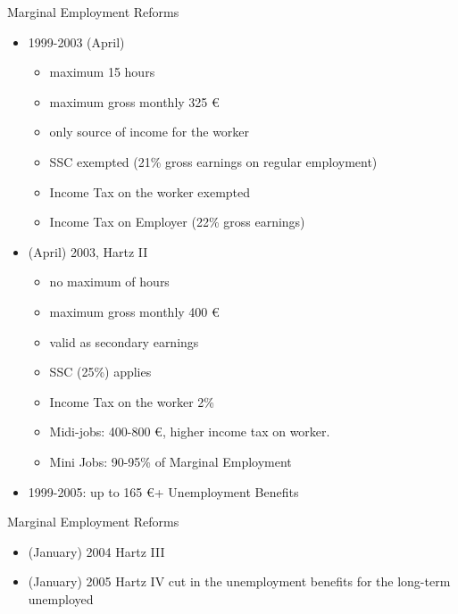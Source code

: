 \documentclass[hyperref={bookmarks=false}]{beamer}
\begin{document}
\begin{frame}{Marginal Employment Reforms}
\begin{itemize}
\setlength{\itemsep}{0.5 cm}
\item 1999-2003 (April)
\begin{itemize}
\item maximum 15 hours
\item maximum gross monthly 325 \euro
\item only source of income for the worker
\item SSC exempted (21\% gross earnings on regular employment)
\item Income Tax on the worker exempted 
\item Income Tax on Employer (22\% gross earnings) 
\end{itemize}
\item (April) 2003, Hartz II
\begin{itemize}
\item no maximum of hours
\item maximum gross monthly 400 \euro
\item valid as secondary earnings 
\item SSC (25\%) applies
\item Income Tax on the worker 2\%
\item Midi-jobs: 400-800 \euro, higher income tax on worker.
\item Mini Jobs: 90-95\% of Marginal Employment
\end{itemize}
\item 1999-2005: up to 165 \euro + Unemployment Benefits
\end{itemize}
\end{frame}

\begin{frame}{Marginal Employment Reforms}
\begin{itemize}
\setlength{\itemsep}{0.5 cm}
\item (January) 2004 Hartz III
\item (January) 2005 Hartz IV cut in the unemployment benefits for the long-term unemployed
\end{itemize}
\end{frame}
\end{document}
